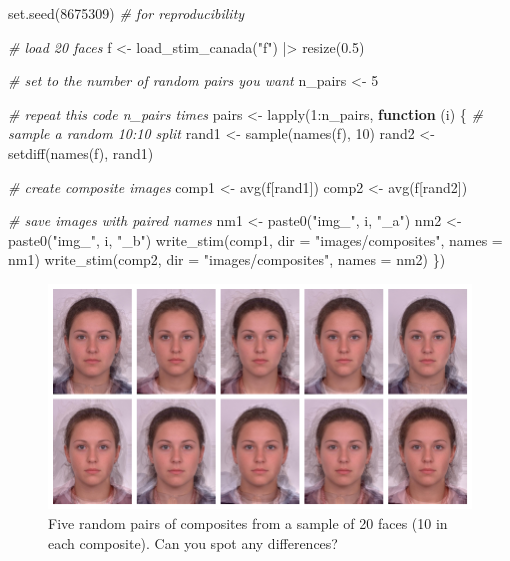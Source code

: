 \documentclass[
  doc,floatsintext]{apa6}
\newenvironment{Shaded}{\begin{snugshade}}{\end{snugshade}}
\newcommand{\AttributeTok}[1]{\textcolor[rgb]{0.77,0.63,0.00}{#1}}
\newcommand{\CommentTok}[1]{\textcolor[rgb]{0.56,0.35,0.01}{\textit{#1}}}
\newcommand{\ControlFlowTok}[1]{\textcolor[rgb]{0.13,0.29,0.53}{\textbf{#1}}}
\newcommand{\DecValTok}[1]{\textcolor[rgb]{0.00,0.00,0.81}{#1}}
\newcommand{\FloatTok}[1]{\textcolor[rgb]{0.00,0.00,0.81}{#1}}
\newcommand{\FunctionTok}[1]{\textcolor[rgb]{0.00,0.00,0.00}{#1}}
\newcommand{\NormalTok}[1]{#1}
\newcommand{\OtherTok}[1]{\textcolor[rgb]{0.56,0.35,0.01}{#1}}
\newcommand{\SpecialCharTok}[1]{\textcolor[rgb]{0.00,0.00,0.00}{#1}}
\newcommand{\StringTok}[1]{\textcolor[rgb]{0.31,0.60,0.02}{#1}}
\begin{document}
\begin{Shaded}
\begin{Highlighting}[]
\FunctionTok{set.seed}\NormalTok{(}\DecValTok{8675309}\NormalTok{) }\CommentTok{\# for reproducibility}

\CommentTok{\# load 20 faces}
\NormalTok{f }\OtherTok{\textless{}{-}} \FunctionTok{load\_stim\_canada}\NormalTok{(}\StringTok{"f"}\NormalTok{) }\SpecialCharTok{|\textgreater{}} \FunctionTok{resize}\NormalTok{(}\FloatTok{0.5}\NormalTok{)}

\CommentTok{\# set to the number of random pairs you want}
\NormalTok{n\_pairs }\OtherTok{\textless{}{-}} \DecValTok{5}

\CommentTok{\# repeat this code n\_pairs times}
\NormalTok{pairs }\OtherTok{\textless{}{-}} \FunctionTok{lapply}\NormalTok{(}\DecValTok{1}\SpecialCharTok{:}\NormalTok{n\_pairs, }\ControlFlowTok{function}\NormalTok{ (i) \{}
  \CommentTok{\# sample a random 10:10 split}
\NormalTok{  rand1 }\OtherTok{\textless{}{-}} \FunctionTok{sample}\NormalTok{(}\FunctionTok{names}\NormalTok{(f), }\DecValTok{10}\NormalTok{)}
\NormalTok{  rand2 }\OtherTok{\textless{}{-}} \FunctionTok{setdiff}\NormalTok{(}\FunctionTok{names}\NormalTok{(f), rand1)}
  
  \CommentTok{\# create composite images}
\NormalTok{  comp1 }\OtherTok{\textless{}{-}} \FunctionTok{avg}\NormalTok{(f[rand1])}
\NormalTok{  comp2 }\OtherTok{\textless{}{-}} \FunctionTok{avg}\NormalTok{(f[rand2])}
  
  \CommentTok{\# save images with paired names}
\NormalTok{  nm1 }\OtherTok{\textless{}{-}} \FunctionTok{paste0}\NormalTok{(}\StringTok{"img\_"}\NormalTok{, i, }\StringTok{"\_a"}\NormalTok{)}
\NormalTok{  nm2 }\OtherTok{\textless{}{-}} \FunctionTok{paste0}\NormalTok{(}\StringTok{"img\_"}\NormalTok{, i, }\StringTok{"\_b"}\NormalTok{)}
  \FunctionTok{write\_stim}\NormalTok{(comp1, }\AttributeTok{dir =} \StringTok{"images/composites"}\NormalTok{, }\AttributeTok{names =}\NormalTok{ nm1)}
  \FunctionTok{write\_stim}\NormalTok{(comp2, }\AttributeTok{dir =} \StringTok{"images/composites"}\NormalTok{, }\AttributeTok{names =}\NormalTok{ nm2)}
\NormalTok{\})}
\end{Highlighting}
\end{Shaded}

\begin{figure}
\includegraphics[width=1\linewidth]{index_files/figure-latex/rand-pair-1} \caption{Five random pairs of composites from a sample of 20 faces (10 in each composite). Can you spot any differences?}\label{fig:rand-pair}
\end{figure}
\end{document}
